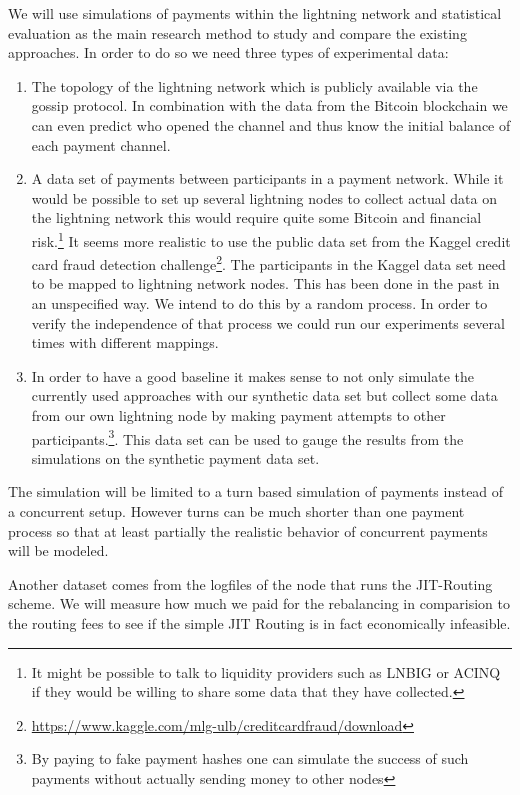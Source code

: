 \documentclass[a4paper]{paper}
\begin{document}
We will use simulations of payments within the lightning network and statistical evaluation as the main research method to study and compare the existing approaches.
In order to do so we need three types of experimental data:
\begin{enumerate}
\item The topology of the lightning network which is publicly available via the gossip protocol. In combination with the data from the Bitcoin blockchain we can even predict who opened the channel and thus know the initial balance of each payment channel.
\item A data set of payments between participants in a payment network. While it would be possible to set up several lightning nodes to collect actual data on the lightning network this would require quite some Bitcoin and financial risk.\footnote{It might be possible to talk to liquidity providers such as LNBIG or ACINQ if they would be willing to share some data that they have collected.} It seems more realistic to use the public data set from the Kaggel credit card fraud detection challenge\footnote{\url{https://www.kaggle.com/mlg-ulb/creditcardfraud/download}}. The participants in the Kaggel data set need to be mapped to lightning network nodes. This has been done in the past \cite{sivaraman2018routing} in an unspecified way. We intend to do this by a random process. In order to verify the independence of that process we could run our experiments several times with different mappings. 
\item In order to have a good baseline it makes sense to not only simulate the currently used approaches with our synthetic data set but collect some data from our own lightning node by making payment attempts to other participants.\footnote{By paying to fake payment hashes one can simulate the success of such payments without actually sending money to other nodes}. This data set can be used to gauge the results from the simulations on the synthetic payment data set.
\end{enumerate}

The simulation will be limited to a turn based simulation of payments instead of a concurrent setup.
However turns can be much shorter than one payment process so that at least partially the realistic behavior of concurrent payments will be modeled.

Another dataset comes from the logfiles of the node that runs the JIT-Routing scheme.
We will measure how much we paid for the rebalancing in comparision to the routing fees to see if the simple JIT Routing is in fact economically infeasible.
\end{document}
